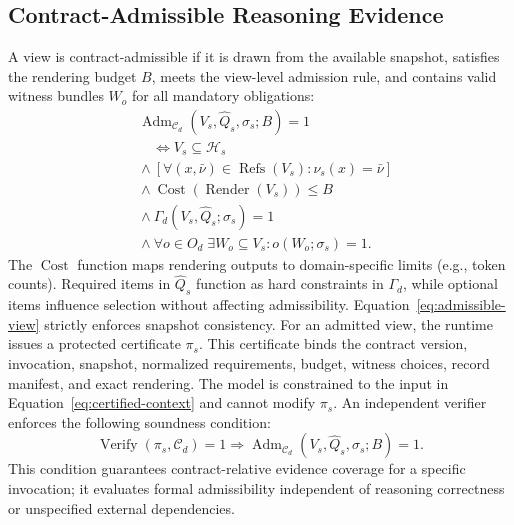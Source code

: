 \subsection{Contract-Admissible Reasoning Evidence}
A view is contract-admissible if it is drawn from the available snapshot, satisfies the rendering budget $B$, meets the view-level admission rule, and contains valid witness bundles $W_o$ for all mandatory obligations:
\begin{equation}
\begin{aligned}
&\operatorname{Adm}_{\mathcal C_d}
(V_s,\widehat Q_s,\sigma_s;B)=1\\
&\quad\Longleftrightarrow
V_s\subseteq\mathcal H_s\\
&{}\land\left[\forall(x,\bar\nu)\in\operatorname{Refs}(V_s):
\nu_s(x)=\bar\nu\right]\\
&{}\land \operatorname{Cost}(\operatorname{Render}(V_s))\le B\\
&{}\land \Gamma_d(V_s,\widehat Q_s;\sigma_s)=1\\
&{}\land \forall o\in O_d\;\exists W_o\subseteq V_s:
o(W_o;\sigma_s)=1 .
\end{aligned}
\label{eq:admissible-view}
\end{equation}
The $\operatorname{Cost}$ function maps rendering outputs to domain-specific limits (e.g., token counts). Required items in $\widehat Q_s$ function as hard constraints in $\Gamma_d$, while optional items influence selection without affecting admissibility. Equation~\eqref{eq:admissible-view} strictly enforces snapshot consistency.
For an admitted view, the runtime issues a protected certificate $\pi_s$. This certificate binds the contract version, invocation, snapshot, normalized requirements, budget, witness choices, record manifest, and exact rendering. The model is constrained to the input in Equation~\eqref{eq:certified-context} and cannot modify $\pi_s$. An independent verifier enforces the following soundness condition:
\begin{equation}
\operatorname{Verify}(\pi_s,\mathcal C_d)=1
\Longrightarrow
\operatorname{Adm}_{\mathcal C_d}
(V_s,\widehat Q_s,\sigma_s;B)=1.
\label{eq:admission-soundness}
\end{equation}
This condition guarantees contract-relative evidence coverage for a specific invocation; it evaluates formal admissibility independent of reasoning correctness or unspecified external dependencies.
